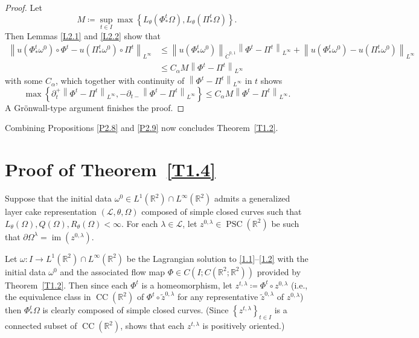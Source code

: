 \documentclass[reqno,centertags,12pt]{amsart}
\theoremstyle{definition}
\numberwithin{equation}{section}
\newcommand{\norm}[1]{\left\|#1\right\|}
\newcommand{\set}[1]{\left\{ #1 \right\}}
\newcommand{\bbR}{{\mathbb{R}}}
\newcommand{\tht}{\theta}
\begin{document}
\begin{proof}
    Let
    \[
        M \coloneqq \sup_{t\in I}\max\left\{
            L_{\tht}(\Phi_{*}^{t}\Omega),
            L_{\tht}(\Pi_{*}^{t}\Omega)
        \right\}.
    \]
    Then Lemmas \ref{L2.1} and \ref{L2.2} show that
    \begin{align*}
        \norm{u(\Phi_{*}^{t}\omega^{0})\circ \Phi^{t}
        - u(\Pi_{*}^{t}\omega^{0})\circ \Pi^{t}}_{L^{\infty}}
        &\leq \norm{u(\Phi_{*}^{t}\omega^{0})}_{\dot{C}^{0,1}}
        \norm{\Phi^{t} - \Pi^{t}}_{L^{\infty}}
        + \norm{u(\Phi_{*}^{t}\omega^{0}) - u(\Pi_{*}^{t}\omega^{0})}_{L^{\infty}} \\
        &\leq C_{\alpha}M\norm{\Phi^{t} - \Pi^{t}}_{L^{\infty}}
    \end{align*}
    with some $C_{\alpha}$, which together with continuity of
    $\norm{\Phi^{t}-\Pi^{t}}_{L^{\infty}}$ in $t$ shows
    \[
        \max\set{
            \partial_{t}^{+}\norm{\Phi^{t} - \Pi^{t}}_{L^{\infty}},
            -\partial_{t-}\norm{\Phi^{t} - \Pi^{t}}_{L^{\infty}}
        }
        \leq C_{\alpha}M\norm{\Phi^{t} - \Pi^{t}}_{L^{\infty}}.
    \]
  A Gr\"{o}nwall-type argument  finishes the proof.
\end{proof}

Combining Propositions \ref{P2.8} and \ref{P2.9} now concludes Theorem~\ref{T1.2}.


\section{Proof of Theorem~\ref{T1.4}}\label{S3}

Suppose that the initial data $\omega^{0}\in L^{1}(\bbR^{2})\cap L^{\infty}(\bbR^{2})$
admits a generalized layer cake representation $(\mathcal{L},\theta,\Omega)$
composed of simple closed curves such that $L_{\tht}(\Omega), Q(\Omega), R_{\tht}(\Omega) < \infty$.
For each $\lambda\in\mathcal{L}$, let $z^{0,\lambda}\in\operatorname{PSC}(\bbR^{2})$ be
such that $\partial\Omega^{\lambda} = \operatorname{im}(z^{0,\lambda})$.

Let $\omega\colon I\to L^{1}(\bbR^{2})\cap L^{\infty}(\bbR^{2})$ be the
Lagrangian solution to \eqref{1.1}--\eqref{1.2} with the initial data $\omega^{0}$
and the associated flow map $\Phi\in C\left(I;C(\bbR^{2};\bbR^{2})\right)$
provided by Theorem~\ref{T1.2}. Then since each $\Phi^{t}$ is a homeomorphism, let
$z^{t,\lambda} \coloneqq \Phi^{t}\circ z^{0,\lambda}$
(i.e., the equivalence class in $\operatorname{CC}(\bbR^{2})$
of $\Phi^{t}\circ\tilde{z}^{0,\lambda}$ for any representative $\tilde{z}^{0,\lambda}$
of $z^{0,\lambda}$) then $\Phi_{*}^{t}\Omega$ is clearly composed of simple closed curves.
(Since $\set{z^{t,\lambda}}_{t\in I}$ is a connected subset of
$\operatorname{CC}(\bbR^{2})$, \cite[Lemma~B.4]{JeoZlaTouching} shows that
each $z^{t,\lambda}$ is positively oriented.)
\end{document}
